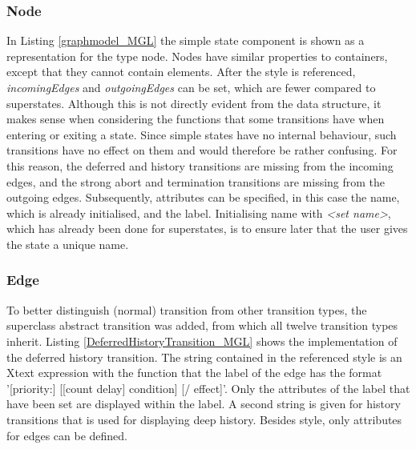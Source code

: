 \subsubsection{Node}
In Listing \ref{graphmodel_MGL} the simple state component is shown as a representation for the type node. Nodes have similar properties to containers, except that they cannot contain elements. After the style is referenced, \textit{incomingEdges} and \textit{outgoingEdges} can be set, which are fewer compared to superstates. Although this is not directly evident from the data structure, it makes sense when considering the functions that some transitions have when entering or exiting a state. Since simple states have no internal behaviour, such transitions have no effect on them and would therefore be rather confusing. For this reason, the deferred and history transitions are missing from the incoming edges, and the strong abort and termination transitions are missing from the outgoing edges. Subsequently, attributes can be specified, in this case the name, which is already initialised, and the label. Initialising name with \textit{<set name>}, which has already been done for superstates, is to ensure later that the user gives the state a unique name.


\subsubsection{Edge}
To better distinguish (normal) transition from other transition types, the superclass abstract transition was added, from which all twelve transition types inherit. Listing \ref{DeferredHistoryTransition_MGL} shows the implementation of the deferred history transition. The string contained in the referenced style is an Xtext expression with the function that the label of the edge has the format '[priority:] [[count delay] condition] [/ effect]'. Only the attributes of the label that have been set are displayed within the label. A second string is given for history transitions that is used for displaying deep history. Besides style, only attributes for edges can be defined.


